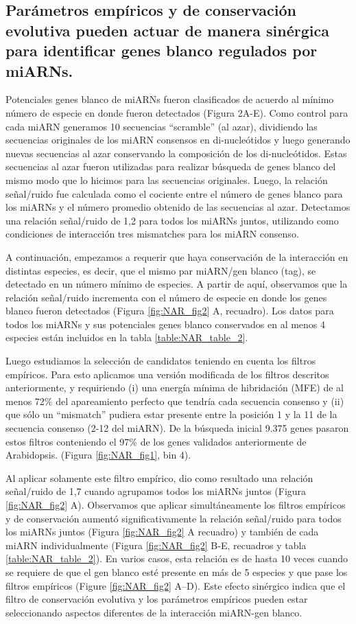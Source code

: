 \subsection{Parámetros empíricos y de conservación evolutiva pueden actuar de manera sinérgica para identificar genes blanco regulados por miARNs.}
Potenciales genes blanco de miARNs fueron clasificados de acuerdo al mínimo número de especie en donde fueron detectados (Figura 2A-E).
Como control para cada miARN generamos 10 secuencias ``scramble'' (al azar), dividiendo las secuencias originales de los miARN consensos en di-nucleótidos y luego generando nuevas secuencias al azar conservando la composición de los di-nucleótidos.
Estas secuencias al azar fueron utilizadas para realizar búsqueda de genes blanco del mismo modo que lo hicimos para las secuencias originales.
Luego, la relación señal/ruido fue calculada como el cociente entre el número de genes blanco para los miARNs y el número promedio obtenido de las secuencias al azar.
Detectamos una relación señal/ruido de 1,2 para todos los miARNs juntos, utilizando como condiciones de interacción tres mismatches para los miARN consenso. 

A continuación, empezamos a requerir que haya conservación de la interacción en distintas especies, es decir, que el mismo par miARN/gen blanco (tag), se detectado en un número mínimo de especies.
A partir de aquí, observamos que la relación señal/ruido incrementa con el número de especie en donde los genes blanco fueron detectados (Figura \ref{fig:NAR_fig2} A, recuadro).
Los datos para todos los miARNs y sus potenciales genes blanco conservados en al menos 4 especies están incluidos en la tabla \ref{table:NAR_table_2}.

Luego estudiamos la selección de candidatos teniendo en cuenta los filtros empíricos.
Para esto aplicamos una versión modificada de los filtros descritos anteriormente, y requiriendo (i) una energía mínima de hibridación (MFE) de al menos 72\% del apareamiento perfecto que tendría cada secuencia consenso y (ii)  que sólo un ``mismatch'' pudiera estar presente entre la posición 1 y la 11 de la secuencia consenso (2-12 del miARN).
De la búsqueda inicial 9.375 genes pasaron estos filtros conteniendo el 97\% de los genes validados anteriormente de Arabidopsis. (Figura \ref{fig:NAR_fig1}, bin 4). 

Al aplicar solamente este filtro empírico, dio como resultado una relación señal/ruido de 1,7 cuando agrupamos todos los miARNs juntos (Figura \ref{fig:NAR_fig2} A).
Observamos que aplicar simultáneamente los filtros empíricos y de conservación aumentó significativamente la relación señal/ruido para todos los miARNs juntos (Figura \ref{fig:NAR_fig2} A recuadro) y también de cada miARN individualmente (Figura \ref{fig:NAR_fig2} B-E, recuadros y tabla \ref{table:NAR_table_2}).
En varios casos, esta relación es de hasta 10 veces cuando se requiere de que el gen blanco esté presente en más de 5 especies y que pase los filtros empíricos (Figure \ref{fig:NAR_fig2} A–D).
Este efecto sinérgico indica que el filtro de conservación evolutiva y los parámetros empíricos pueden estar seleccionando aspectos diferentes de la interacción miARN-gen blanco.

